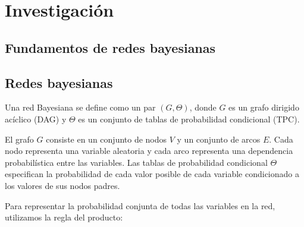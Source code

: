 \section{Investigación}

\subsection{Fundamentos de redes bayesianas}


\subsection*{Redes bayesianas}
Una red Bayesiana se define como un par \( (G, \Theta) \), donde \( G \) es un grafo dirigido acíclico (DAG) y \( \Theta \) es un conjunto de tablas de probabilidad condicional (TPC). 

El grafo \( G \) consiste en un conjunto de nodos \( V \) y un conjunto de arcos \( E \). Cada nodo representa una variable aleatoria y cada arco representa una dependencia probabilística entre las variables. Las tablas de probabilidad condicional \( \Theta \) especifican la probabilidad de cada valor posible de cada variable condicionado a los valores de sus nodos padres.

Para representar la probabilidad conjunta de todas las variables en la red, utilizamos la regla del producto:


